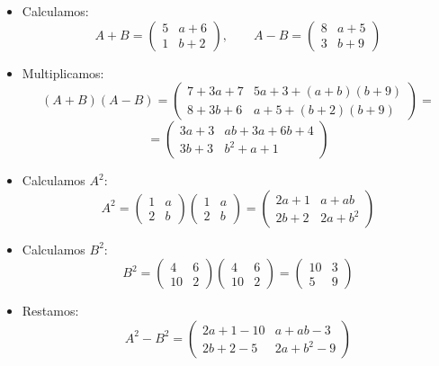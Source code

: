 \documentclass[a4paper,12pt]{article}
\begin{document}
\begin{ejercicio}[title=Ejercicio 2]
\begin{itemize}
    \item Calculamos:
    \[
    A+B =
    \begin{pmatrix}
    5 & a+6\\
    1 & b+2
    \end{pmatrix},\qquad
    A-B =
    \begin{pmatrix}
    8 & a+5\\
    3 & b+9
    \end{pmatrix}
    \]
    \item Multiplicamos:
    \[
    (A+B)(A-B) =
    \begin{pmatrix}
    7+3a+7 & 5a+3+(a+b)(b+9)\\
    8+3b+6 & a+5+(b+2)(b+9)
    \end{pmatrix} =
    \]
    \[ =
    \begin{pmatrix}
    3a+3 & ab+3a+6b+4\\
    3b+3 & b^2+a+1
    \end{pmatrix}
    \]
    \item Calculamos $A^2$:
    \[
    A^2 = 
    \begin{pmatrix}
    1 & a\\
    2 & b
    \end{pmatrix}
    \begin{pmatrix}
    1 & a\\
    2 & b
    \end{pmatrix}
    =
    \begin{pmatrix}
    2a+1 & a+ab\\
    2b+2 & 2a+b^2
    \end{pmatrix}
    \]
    \item Calculamos $B^2$:
    \[
    B^2 =
    \begin{pmatrix}
    4 & 6\\
    10 & 2
    \end{pmatrix}
    \begin{pmatrix}
    4 & 6\\
    10 & 2
    \end{pmatrix}
    =
    \begin{pmatrix}
    10 & 3\\
    5 & 9
    \end{pmatrix}
    \]
    \item Restamos:
    \[
    A^2-B^2 =
    \begin{pmatrix}
    2a+1-10 & a+ab-3\\
    2b+2-5 & 2a+b^2-9
    \end{pmatrix}
\]
\end{itemize}
\end{ejercicio}
\end{document}
